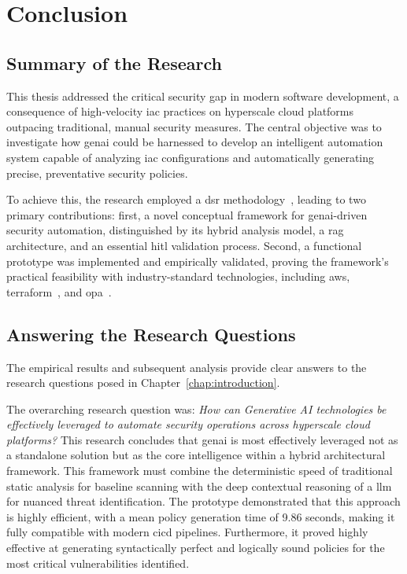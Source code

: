 
\chapter{Conclusion} %
\label{chap:conclusion} %

\section{Summary of the Research}

This thesis addressed the critical security gap in modern software development, a consequence of high-velocity \gls{iac} practices on hyperscale cloud platforms outpacing traditional, manual security measures. The central objective was to investigate how \gls{genai} could be harnessed to develop an intelligent automation system capable of analyzing \gls{iac} configurations and automatically generating precise, preventative security policies.

To achieve this, the research employed a \gls{dsr} methodology~\cite{hevner_design_2004}, leading to two primary contributions: first, a novel conceptual framework for \gls{genai}-driven security automation, distinguished by its hybrid analysis model, a \gls{rag} architecture, and an essential \gls{hitl} validation process. Second, a functional prototype was implemented and empirically validated, proving the framework's practical feasibility with industry-standard technologies, including \gls{aws}, \gls{terraform}~\cite{howard_terraform_2022}, and \gls{opa}~\cite{the_opa_authors_open_2025}.

\section{Answering the Research Questions}

The empirical results and subsequent analysis provide clear answers to the research questions posed in Chapter~\ref{chap:introduction}.

The overarching research question was: \textit{How can Generative AI technologies be effectively leveraged to automate security operations across hyperscale cloud platforms?}
This research concludes that \gls{genai} is most effectively leveraged not as a standalone solution but as the core intelligence within a hybrid architectural framework. This framework must combine the deterministic speed of traditional static analysis for baseline scanning with the deep contextual reasoning of a \gls{llm} for nuanced threat identification. The prototype demonstrated that this approach is highly efficient, with a mean policy generation time of 9.86 seconds, making it fully compatible with modern \gls{cicd} pipelines. Furthermore, it proved highly effective at generating syntactically perfect and logically sound policies for the most critical vulnerabilities identified.

